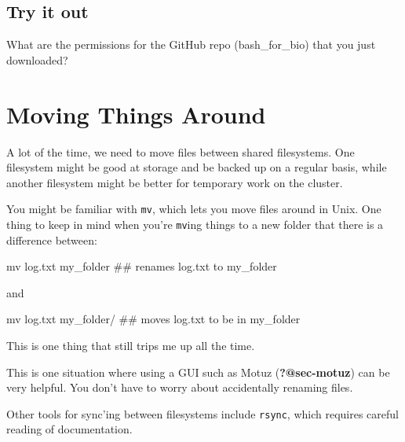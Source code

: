 \documentclass[
  letterpaper,
  DIV=11,
  numbers=noendperiod]{scrreprt}
\newenvironment{Shaded}{\begin{snugshade}}{\end{snugshade}}
\newcommand{\CommentTok}[1]{\textcolor[rgb]{0.37,0.37,0.37}{#1}}
\newcommand{\FunctionTok}[1]{\textcolor[rgb]{0.28,0.35,0.67}{#1}}
\newcommand{\NormalTok}[1]{\textcolor[rgb]{0.00,0.23,0.31}{#1}}
\begin{document}
\subsection{Try it out}\label{try-it-out-1}

What are the permissions for the GitHub repo (bash\_for\_bio) that you
just downloaded?

\section{Moving Things Around}\label{sec-moving}

A lot of the time, we need to move files between shared filesystems. One
filesystem might be good at storage and be backed up on a regular basis,
while another filesystem might be better for temporary work on the
cluster.

You might be familiar with \texttt{mv}, which lets you move files around
in Unix. One thing to keep in mind when you're \texttt{mv}ing things to
a new folder that there is a difference between:

\begin{Shaded}
\begin{Highlighting}[]
\FunctionTok{mv}\NormalTok{ log.txt my\_folder   }\CommentTok{\#\# renames log.txt to my\_folder}
\end{Highlighting}
\end{Shaded}

and

\begin{Shaded}
\begin{Highlighting}[]
\FunctionTok{mv}\NormalTok{ log.txt my\_folder/  }\CommentTok{\#\# moves log.txt to be in my\_folder}
\end{Highlighting}
\end{Shaded}

This is one thing that still trips me up all the time.

This is one situation where using a GUI such as Motuz
(\textbf{?@sec-motuz}) can be very helpful. You don't have to worry
about accidentally renaming files.

Other tools for sync'ing between filesystems include \texttt{rsync},
which requires careful reading of documentation.
\end{document}

